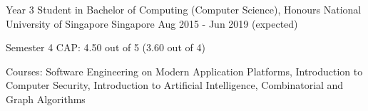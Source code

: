 

\begin{cventries}

  \cventry
  {Year 3 Student in Bachelor of Computing (Computer Science), Honours} %
  {National University of Singapore} %
  {Singapore} %
  {Aug 2015 - Jun 2019 (expected)} %
  {
    \begin{cvitems} %
    \item {Semester 4 CAP: 4.50 out of 5 (3.60 out of 4)}
    \item {Courses: Software Engineering on Modern Application Platforms, Introduction to Computer Security, Introduction to Artificial Intelligence, Combinatorial and Graph Algorithms}
    \end{cvitems}
  }

\end{cventries}

